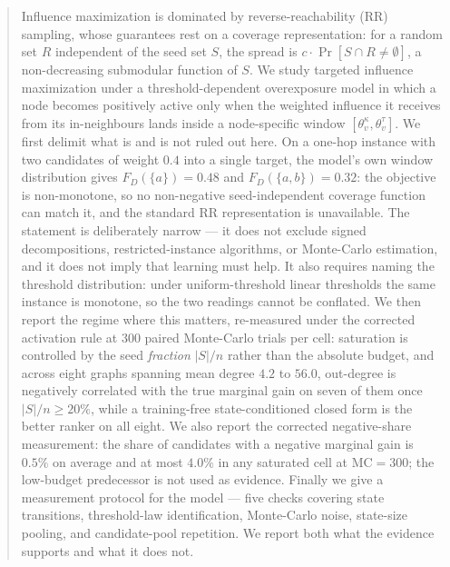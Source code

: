 \begin{abstract}
Influence maximization is dominated by reverse-reachability (RR) sampling, whose guarantees rest
on a coverage representation: for a random set $R$ independent of the seed set $S$, the spread is
$c \cdot \Pr[S \cap R \neq \emptyset]$, a non-decreasing submodular function of $S$. We study
targeted influence maximization under a threshold-dependent overexposure model in which a node
becomes positively active only when the weighted influence it receives from its in-neighbours lands
inside a node-specific window $[\theta^\kappa_v, \theta^\tau_v]$. We first delimit what is and is
not ruled out here. On a one-hop instance with two candidates of weight $0.4$ into a single target,
the model's own window distribution gives $F_D(\{a\}) = 0.48$ and $F_D(\{a,b\}) = 0.32$: the
objective is non-monotone, so no non-negative seed-independent coverage function can match it, and
the standard RR representation is unavailable. The statement is deliberately narrow --- it does
not exclude signed decompositions, restricted-instance algorithms, or Monte-Carlo estimation, and
it does not imply that learning must help. It also requires naming the threshold distribution:
under uniform-threshold linear thresholds the same instance is monotone, so the two readings cannot
be conflated. We then report the regime where this matters, re-measured under the corrected
activation rule at $300$ paired Monte-Carlo trials per cell: saturation is controlled by the seed
\emph{fraction} $|S|/n$ rather than the absolute budget, and across eight graphs spanning mean
degree $4.2$ to $56.0$, out-degree is negatively correlated with the true marginal gain on seven of
them once $|S|/n \ge 20\%$, while a training-free state-conditioned closed form is the better
ranker on all eight. We also report the corrected negative-share measurement: the share of candidates
with a negative marginal gain is $0.5\%$ on average and at most $4.0\%$ in any saturated cell at
$\mathrm{MC}=300$; the low-budget predecessor is not used as evidence. Finally we give a
measurement protocol for the model --- five checks covering state transitions, threshold-law
identification, Monte-Carlo noise, state-size pooling, and candidate-pool repetition. We report
both what the evidence supports and what it does not.

\end{abstract}
